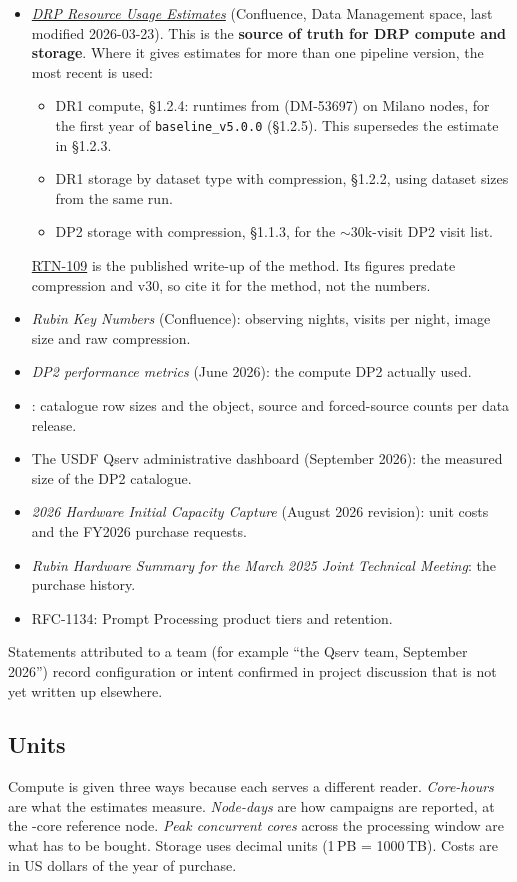 \begin{itemize}
\item \href{https://rubinobs.atlassian.net/wiki/spaces/DM/pages/1062404112/DRP+Resource+Usage+Estimates}{\emph{DRP Resource Usage Estimates}}
      (Confluence, Data Management space, last modified 2026-03-23). This is
      the \textbf{source of truth for DRP compute and storage}. Where it gives
      estimates for more than one pipeline version, the most recent is used:
      \begin{itemize}
      \item DR1 compute, \S1.2.4: runtimes from \vthirty{} (DM-53697) on
            Milano nodes, for the first year of \texttt{baseline\_v5.0.0}
            (\S1.2.5). This supersedes the \wfortyone{} estimate in \S1.2.3.
      \item DR1 storage by dataset type with compression, \S1.2.2, using
            dataset sizes from the same run.
      \item DP2 storage with compression, \S1.1.3, for the $\sim$30k-visit DP2
            visit list.
      \end{itemize}
      \href{https://rtn-109.lsst.io/}{RTN-109} is the published write-up of
      the method. Its figures predate compression and v30, so cite it for the
      method, not the numbers.
\item \emph{Rubin Key Numbers} (Confluence): observing nights, visits per
      night, image size and raw compression.
\item \emph{DP2 performance metrics} (June 2026): the compute DP2 actually
      used.
\item {}: catalogue row sizes and the object, source and
      forced-source counts per data release.
\item The USDF Qserv administrative dashboard (September 2026): the measured
      size of the DP2 catalogue.
\item \emph{2026 Hardware Initial Capacity Capture} (August 2026 revision):
      unit costs and the FY2026 purchase requests.
\item \emph{Rubin Hardware Summary for the March 2025 Joint Technical
      Meeting}: the purchase history.
\item RFC-1134: Prompt Processing product tiers and retention.
\end{itemize}

Statements attributed to a team (for example ``the Qserv team, September
2026'') record configuration or intent confirmed in project discussion that
is not yet written up elsewhere.

\subsection{Units}

Compute is given three ways because each serves a different reader.
\emph{Core-hours} are what the estimates measure. \emph{Node-days} are how
campaigns are reported, at the \smCoresNode{}-core reference node.
\emph{Peak concurrent cores} across the processing window are what has to be
bought. Storage uses decimal units (1\,PB = 1000\,TB). Costs are in US dollars
of the year of purchase.
